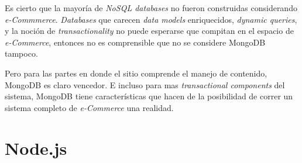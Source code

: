 Es cierto que la mayoría de \textit{NoSQL databases} no fueron construidas considerando \textit{e-Commmerce}. \textit{Databases} que carecen \textit{data models} enriquecidos, \textit{dynamic queries}, y la noción de \textit{transactionality} no puede esperarse que compitan en el espacio de \textit{e-Commerce}, entonces no es comprensible que no se considere MongoDB tampoco.

Pero para las partes en donde el sitio \textit{} comprende el manejo de contenido, MongoDB es claro vencedor. E incluso para mas \textit{transactional components} del sistema, MongoDB tiene características que hacen de la posibilidad de correr un sistema completo de \textit{e-Commerce} una realidad.


\section{Node.js}




